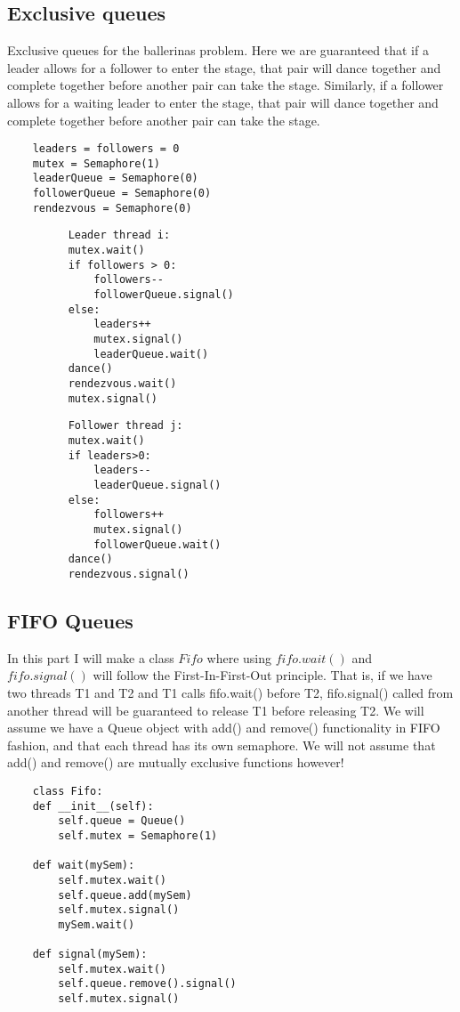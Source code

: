 \subsection{Exclusive queues}
Exclusive queues for the ballerinas problem. Here we are guaranteed that if a leader allows for a follower to enter the stage, that pair will dance together and complete together before another pair can take the stage. Similarly, if a follower allows for a waiting leader to enter the stage, that pair will dance together and complete together before another pair can take the stage.
\begin{verbatim}
    leaders = followers = 0
    mutex = Semaphore(1)
    leaderQueue = Semaphore(0)
    followerQueue = Semaphore(0)
    rendezvous = Semaphore(0)
\end{verbatim}
\begin{figure}[H]
    \begin{minipage}{0.5\textwidth}
    \centering
    \begin{verbatim}
    Leader thread i:
    mutex.wait()
    if followers > 0:
        followers--
        followerQueue.signal()
    else:
        leaders++
        mutex.signal()
        leaderQueue.wait()
    dance()
    rendezvous.wait()
    mutex.signal()
    \end{verbatim}
    \end{minipage}
    \begin{minipage}{0.5\textwidth}
    \centering
    \begin{verbatim}
    Follower thread j:
    mutex.wait()
    if leaders>0:
        leaders--
        leaderQueue.signal()
    else:
        followers++
        mutex.signal()
        followerQueue.wait()
    dance()
    rendezvous.signal()
    \end{verbatim}
    \end{minipage}
\end{figure}

\newpage
\subsection{FIFO Queues}
In this part I will make a class $Fifo$ where using $fifo.wait()$ and $fifo.signal()$ will follow the First-In-First-Out principle. That is, if we have two threads T1 and T2 and T1 calls fifo.wait() before T2, fifo.signal() called from another thread will be guaranteed to release T1 before releasing T2. We will assume we have a Queue object with add() and remove() functionality in FIFO fashion, and that each thread has its own semaphore. We will not assume that add() and remove() are mutually exclusive functions however!
\begin{verbatim}
    class Fifo:
    def __init__(self):
        self.queue = Queue()
        self.mutex = Semaphore(1)
    
    def wait(mySem):
        self.mutex.wait()
        self.queue.add(mySem)
        self.mutex.signal()
        mySem.wait()
        
    def signal(mySem):
        self.mutex.wait()
        self.queue.remove().signal()
        self.mutex.signal()
\end{verbatim}